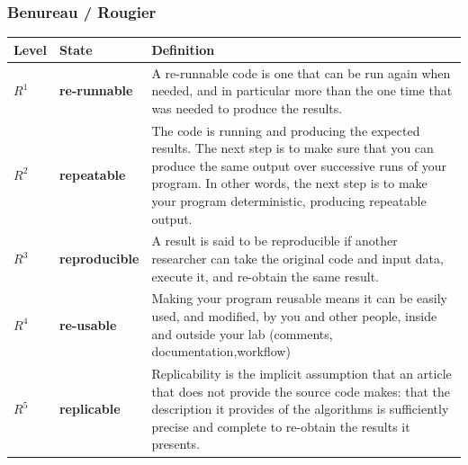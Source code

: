 \begin{frame}
\frametitle{Benureau / Rougier}
\setcellgapes{0.3em}
\vspace{-0.2cm}
\begin{tabular}{|p{1cm}|p{2cm}|p{10cm}|}
  \hline
\cellcolor{bl1}Level & \cellcolor{bl1} State & Definition \cellcolor{bl1}\\
  \hline
$R^1$   & \textbf{re-runnable} & A re-runnable code is one that can be run again when needed, and in particular more than the one time that was needed to produce the results. \\
  \hline
 $R^2$   & \textbf{repeatable} & The code is running and producing the expected results. The next step is to make sure that you can produce the same output over successive runs of your program. In other words, the next step is to make your program deterministic, producing repeatable output. \\
  \hline
  $R^3$   & \textbf{reproducible} & A result is said to be reproducible if another researcher can take the original code and input data, execute it, and re-obtain the same result. \\
  \hline
$R^4$    & \textbf{re-usable} & Making your program reusable means it can be easily used, and modified, by you and other people, inside and outside your lab (comments, documentation,workflow)  \\ 
  \hline
 $R^5$    & \textbf{replicable} & Replicability is the implicit assumption that an article that does not provide the source code makes: that the description it provides of the algorithms is sufficiently precise and complete to re-obtain the results it presents. \\ 
  \hline 
\end{tabular}
\end{frame}




